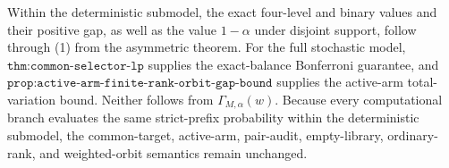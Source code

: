 Within the deterministic submodel, the exact four-level and binary values and their positive gap, as well as the value \(1-\alpha\) under disjoint support, follow through (1) from the asymmetric theorem. For the full stochastic model, \(\texttt{thm:common-selector-lp}\) supplies the exact-balance Bonferroni guarantee, and \(\texttt{prop:active-arm-finite-rank-orbit-gap-bound}\) supplies the active-arm total-variation bound. Neither follows from \(\Gamma_{M,\alpha}(w)\). Because every computational branch evaluates the same strict-prefix probability within the deterministic submodel, the common-target, active-arm, pair-audit, empty-library, ordinary-rank, and weighted-orbit semantics remain unchanged.